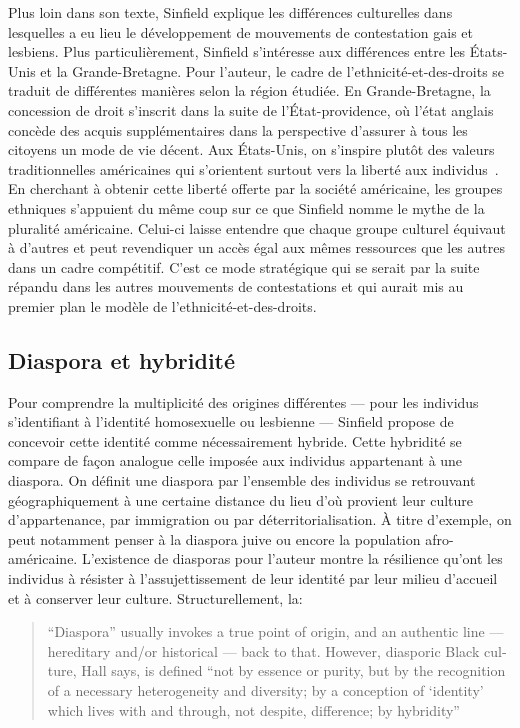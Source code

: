 Plus loin dans son texte, Sinfield explique les différences culturelles dans lesquelles a eu lieu le développement de mouvements de contestation gais et lesbiens.
Plus particulièrement, Sinfield s'intéresse aux différences entre les États-Unis et la Grande-Bretagne.
Pour l'auteur, le cadre de l'ethnicité-et-des-droits se traduit de différentes manières selon la région étudiée.
En Grande-Bretagne, la concession de droit s'inscrit dans la suite de l'État-providence, où l'état anglais concède des acquis supplémentaires dans la perspective d'assurer à tous les citoyens un mode de vie décent.
Aux États-Unis, on s'inspire plutôt des valeurs traditionnelles américaines qui s'orientent surtout vers la liberté aux individus~\citep[274]{Sinfield1996}.
En cherchant à obtenir cette liberté offerte par la société américaine, les groupes ethniques s'appuient du même coup sur ce que Sinfield nomme le mythe de la pluralité américaine.
Celui-ci laisse entendre que chaque groupe culturel équivaut à d'autres et peut revendiquer un accès égal aux mêmes ressources que les autres dans un cadre compétitif.
C'est ce mode stratégique qui se serait par la suite répandu dans les autres mouvements de contestations et qui aurait mis au premier plan le modèle de l'ethnicité-et-des-droits.

\subsection{Diaspora et hybridité}
\label{sub:diaspora_et_hybridite}

Pour comprendre la multiplicité des origines différentes --- pour les individus s'identifiant à l'identité homosexuelle ou lesbienne --- Sinfield propose de concevoir cette identité comme nécessairement hybride.
Cette hybridité se compare de façon analogue celle imposée aux individus appartenant à une diaspora.
On définit une diaspora par l'ensemble des individus se retrouvant géographiquement à une certaine distance du lieu d'où provient leur culture d'appartenance, par immigration ou par déterritorialisation.
À titre d'exemple, on peut notamment penser à la diaspora juive ou encore la population afro-américaine.
L'existence de diasporas pour l'auteur montre la résilience qu'ont les individus à résister à l'assujettissement de leur identité par leur milieu d'accueil et à conserver leur culture.
Structurellement, la: \foreignblockquote{english}[{\cite[278]{Sinfield1996}}][.]{\enquote{Diaspora} \textelp{} usually invokes a true point of origin, and an authentic line --- hereditary and/or historical --- back to that. However, diasporic Black culture, Hall says, is defined \enquote{not by essence or purity, but by the recognition of a necessary heterogeneity and diversity; by a conception of \enquote{identity} which lives with and through, not despite, difference; by hybridity}}

